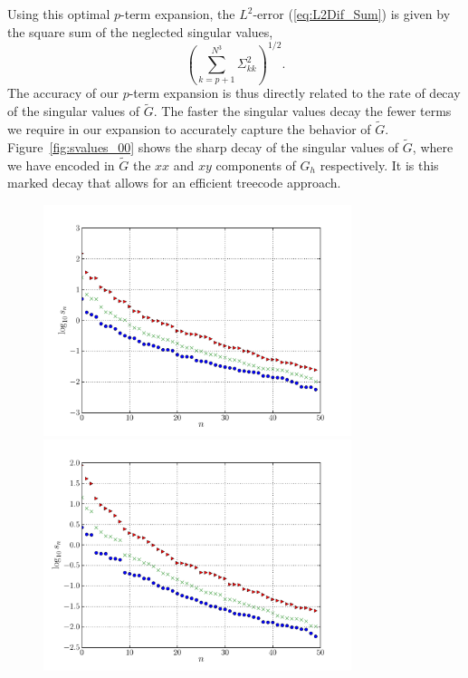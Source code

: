 \documentclass[preprint,12pt]{elsarticle}
\newcommand{\ti}[1]{\tilde{#1}}
\newcommand{\StandardFigureWidth}{3.5375in}%
\begin{document}
Using this optimal $p$-term expansion, the $L^2$-error (\ref{eq:L2Dif_Sum}) is given by the square sum of the neglected singular values,
\begin{equation}
\left( \sum_{k=p+1}^{N^3}\Sigma_{kk}^2 \right)^{1/2}.
\end{equation}
The accuracy of our $p$-term expansion is thus directly related to the rate of decay of the singular values of $\ti{G}$. The faster the singular values decay the fewer terms we require in our expansion  to accurately capture the behavior of $\ti{G}$. Figure~\ref{fig:svalues_00} shows the sharp decay of the singular values of $\ti{G}$, where we have encoded in $\ti{G}$ the $xx$ and $xy$ components of $G_h$ respectively. It is this marked decay that allows for an efficient treecode approach.
\begin{figure}[htb]
	\begin{center}
		\includegraphics[bb=0in 0in 7.7in 6.3in,width=\StandardFigureWidth,clip]{svalues_00.pdf}
	\end{center}
	\begin{center}
		\includegraphics[bb=0in 0in 7.7in 6.3in,width=\StandardFigureWidth,clip]{svalues_01.pdf}

\end{center}
\end{figure}
\end{document}
